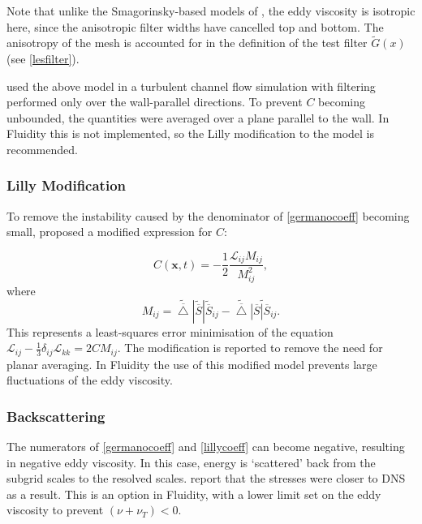 Note that unlike the Smagorinsky-based models of \citet{bentham2003}, the eddy viscosity is isotropic here, since the anisotropic filter widths have cancelled top and bottom. The anisotropy of the mesh is accounted for in the definition of the test filter $\widetilde G(x)$ (see \ref{lesfilter}).

\citet{germano1991} used the above model in a turbulent channel flow simulation with filtering performed only over the wall-parallel directions. To prevent $C$ becoming unbounded, the quantities were averaged over a plane parallel to the wall. In Fluidity this is not implemented, so the Lilly modification to the model is recommended.

\subsubsection{Lilly Modification}

To remove the instability caused by the denominator of \eqref{germanocoeff} becoming small, \citet{lilly} proposed a modified expression for $C$:

\begin{equation}\label{lillycoeff}
C(\mathbf x, t) = - \frac{1}{2} \frac{\mathcal L_{ij} M_{ij}}{M^2_{ij}},
\end{equation}
where
\begin{equation}
M_{ij} = {\widetilde{\overline \bigtriangleup} | \widetilde{\overline S} | \widetilde{\overline S}_{ij} -
\widetilde{\overline \bigtriangleup} \widetilde{ | \overline S | \overline S_{ij}}}.
\end{equation}
This represents a least-squares error minimisation of the equation $\mathcal L_{ij} - \frac 1 3 \delta_{ij} \mathcal L_{kk} = 2CM_{ij}$. The modification is reported to remove the need for planar averaging. In Fluidity the use of this modified model prevents large fluctuations of the eddy viscosity.


\subsubsection{Backscattering}

The numerators of \eqref{germanocoeff} and \eqref{lillycoeff} can become negative, resulting in negative eddy viscosity. In this case, energy is `scattered' back from the subgrid scales to the resolved scales. \citet{germano1991} report that the stresses were closer to DNS as a result. This is an option in Fluidity, with a lower limit set on the eddy viscosity to prevent $(\nu + \nu_T) < 0$.


